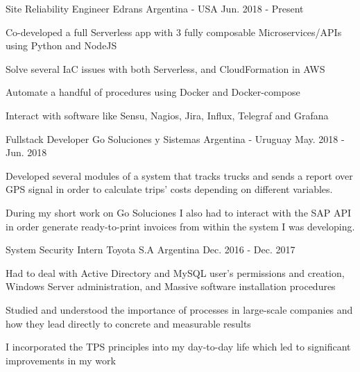 

\begin{cventries}
\cventry
{Site Reliability Engineer} %
{Edrans} %
{Argentina - USA} %
{Jun. 2018 - Present} %
{
\begin{cvitems} %
\item {Co-developed a full Serverless app with 3 fully composable Microservices/APIs using Python and NodeJS}
\item {Solve several IaC issues with both Serverless, and CloudFormation in AWS}
\item {Automate a handful of procedures using Docker and Docker-compose}
\item{Interact with software like Sensu, Nagios, Jira, Influx, Telegraf and Grafana}
\end{cvitems}
}


\cventry
{Fullstack Developer} %
{Go Soluciones y Sistemas} %
{Argentina - Uruguay} %
{May. 2018 - Jun. 2018} %
{
\begin{cvitems} %
\item {Developed several modules of a system that tracks trucks and sends a report over GPS signal in order to calculate trips' costs depending on different variables.}
\item {During my short work on Go Soluciones I also had to interact with the SAP API in order generate ready-to-print invoices from within the system I was developing.}
\end{cvitems}
}


\cventry
{System Security Intern} %
{Toyota S.A} %
{Argentina} %
{Dec. 2016 - Dec. 2017} %
{
\begin{cvitems} %
\item {Had to deal with Active Directory and MySQL user's permissions and creation, Windows Server administration, and Massive software installation procedures}
\item {Studied and understood the importance of processes in large-scale companies and how they lead directly to concrete and measurable results}
\item {I incorporated the TPS principles into my day-to-day life which led to significant improvements in my work}
\end{cvitems}
}



\end{cventries}
